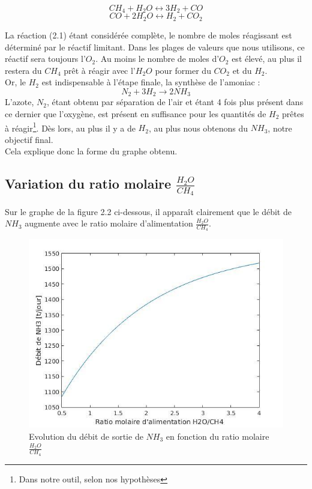 \documentclass[12pt]{report}
\begin{document}
 \begin{equation}
 CH_4 + H_2O \leftrightarrow 3H_2 + CO
 \end{equation}
 \begin{equation}
 CO + 2H_2O \leftrightarrow H_2 + CO_2
 \end{equation}

La réaction (2.1) étant considérée complète, le nombre de moles réagissant est déterminé par le réactif limitant. Dans les plages de valeurs que nous utilisons, ce réactif sera toujours l'$O_2$. Au moins le nombre de moles d'$O_2$ est élevé, au plus il restera du $CH_4$ prêt à réagir avec l'$H_2O$ pour former du $CO_2$ et du $H_2$.\\

Or, le $H_2$ est indispensable à l'étape finale, la synthèse de l'amoniac : 
\begin{equation}
N_2 + 3H_2 \rightarrow 2NH_3
\end{equation}
L'azote, $N_2$, étant obtenu par séparation de l'air et étant 4 fois plus présent dans ce dernier que l'oxygène, est présent en suffisance pour les quantités de $H_2$ prêtes à réagir\footnote{Dans notre outil, selon nos hypothèses}. Dès lors, au plus il y a de $H_2$, au plus nous obtenons du $NH_3$, notre objectif final.\\

Cela explique donc la forme du graphe obtenu.\\

\subsection{Variation du ratio molaire $\frac{H_2O}{CH_4}$}

Sur le graphe de la figure 2.2 ci-dessous, il apparaît clairement que le débit de $NH_3$ augmente avec le ratio molaire d'alimentation $\frac{H_2O}{CH_4}$.\\

\begin{figure}[H]
\begin{center}
\includegraphics[scale=0.6]{debit_NH3_ratio_H2O}
\caption{Evolution du débit de sortie de $NH_3$ en fonction du ratio molaire $\frac{H_2O}{CH_4}$}
\end{center}
\end{figure}
\end{document}
